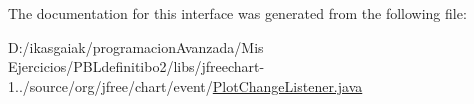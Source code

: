 The documentation for this interface was generated from the following file\+:\begin{DoxyCompactItemize}
\item 
D\+:/ikasgaiak/programacion\+Avanzada/\+Mis Ejercicios/\+P\+B\+Ldefinitibo2/libs/jfreechart-\/1../source/org/jfree/chart/event/\mbox{\hyperlink{_plot_change_listener_8java}{Plot\+Change\+Listener.\+java}}\end{DoxyCompactItemize}

